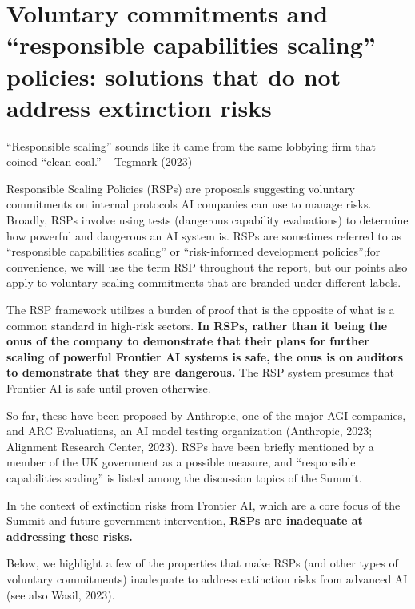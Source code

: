 \documentclass[12pt,a4paper]{article}
\begin{document}
\newpage
\section{Voluntary commitments and “responsible capabilities scaling” policies: solutions that do not address extinction risks}
\hfill\begin{minipage}{\dimexpr\textwidth-1cm}
“Responsible scaling” sounds like it came from the same lobbying firm that coined “clean coal.” – Tegmark (2023)
\end{minipage}
\hspace{1cm}


Responsible Scaling Policies (RSPs) are proposals suggesting voluntary commitments on internal protocols AI companies can use to manage risks. Broadly, RSPs involve using tests (dangerous capability evaluations) to determine how powerful and dangerous an AI system is. RSPs are sometimes referred to as “responsible capabilities scaling” or “risk-informed development policies”;for convenience, we will use the term RSP throughout the report, but our points also apply to voluntary scaling commitments that are branded under different labels. 

The RSP framework utilizes a burden of proof that is the opposite of what is a common standard in high-risk sectors.\textbf{ In RSPs, rather than it being the onus of the company to demonstrate that their plans for further scaling of powerful Frontier AI systems is safe, the onus is on auditors to demonstrate that they are dangerous.} The RSP system presumes that Frontier AI is safe until proven otherwise.  

So far, these have been proposed by Anthropic, one of the major AGI companies, and ARC Evaluations, an AI model testing organization (Anthropic, 2023; Alignment Research Center, 2023). RSPs have been briefly mentioned by a member of the UK government as a possible measure, and “responsible capabilities scaling” is listed among the discussion topics of the Summit.

In the context of extinction risks from Frontier AI, which are a core focus of the Summit and future government intervention, \textbf{RSPs are inadequate at addressing these risks.}

Below, we highlight a few of the properties that make RSPs (and other types of voluntary commitments) inadequate to address extinction risks from advanced AI (see also Wasil, 2023).
\end{document}

